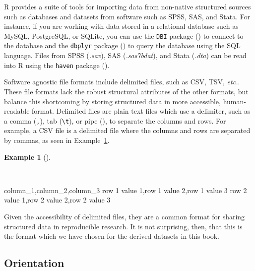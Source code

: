 \documentclass[
  letterpaper,
]{latex/krantz}
\newenvironment{Shaded}{\begin{snugshade}}{\end{snugshade}}
\newcommand{\NormalTok}[1]{\textcolor[rgb]{0.00,0.00,0.00}{#1}}
\theoremstyle{definition}
\newtheorem{example}{Example}[chapter]
\theoremstyle{remark}
\begin{document}
R provides a suite of tools for importing data from non-native
structured sources such as databases and datasets from software such as
SPSS, SAS, and Stata. For instance, if you are working with data stored
in a relational database such as MySQL, PostgreSQL, or SQLite, you can
use the \texttt{DBI} package () to connect to
the database and the \texttt{dbplyr} package
() to query the
database using the SQL language. Files from SPSS (\emph{.sav}), SAS
(\emph{.sas7bdat}), and Stata (\emph{.dta}) can be read into R using the
\texttt{haven} package ().

Software agnostic file formats include delimited files, such as CSV,
TSV, \emph{etc.}. These file formats lack the robust structural
attributes of the other formats, but balance this shortcoming by storing
structured data in more accessible, human-readable format. Delimited
files are plain text files which use a delimiter, such as a comma
(\texttt{,}), tab (\texttt{\textbackslash{}t}), or pipe
(\texttt{\textbar{}}), to separate the columns and rows. For example, a
CSV file is a delimited file where the columns and rows are separated by
commas, as seen in Example~\ref{exm-cd-csv-example}.

\begin{example}[]\protect\hypertarget{exm-cd-csv-example}{}\label{exm-cd-csv-example}

~

\begin{Shaded}
\begin{Highlighting}[]
\NormalTok{column\_1,column\_2,column\_3}
\NormalTok{row 1 value 1,row 1 value 2,row 1 value 3}
\NormalTok{row 2 value 1,row 2 value 2,row 2 value 3}
\end{Highlighting}
\end{Shaded}

\end{example}

Given the accessibility of delimited files, they are a common format for
sharing structured data in reproducible research. It is not surprising,
then, that this is the format which we have chosen for the derived
datasets in this book.

\subsection{Orientation}\label{orientation-1}
\end{document}
